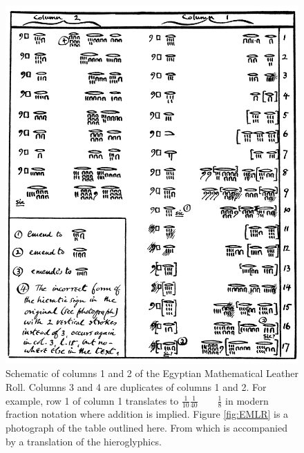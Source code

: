 \begin{figure}
  \centering
  \includegraphics[width=\textwidth]{gfx/EMLRschematic}
  \caption[Schematic of columns 1 and 2 of the Egyptian Mathematical Leather Roll.]
  {Schematic of columns 1 and 2 of the Egyptian Mathematical Leather Roll. Columns 3 and 4 are duplicates of columns 1 and 2. For example, row 1 of column 1 translates to $\displaystyle \frac{1}{10}\frac{1}{40} \quad\quad \frac{1}{8}$ in modern fraction notation where addition is implied. Figure \ref{fig:EMLR} is a photograph of the table outlined here. From \citet{Glanville27} which is accompanied by a translation of the hieroglyphics.}
  \label{fig:EMLRschematic}
\end{figure}


